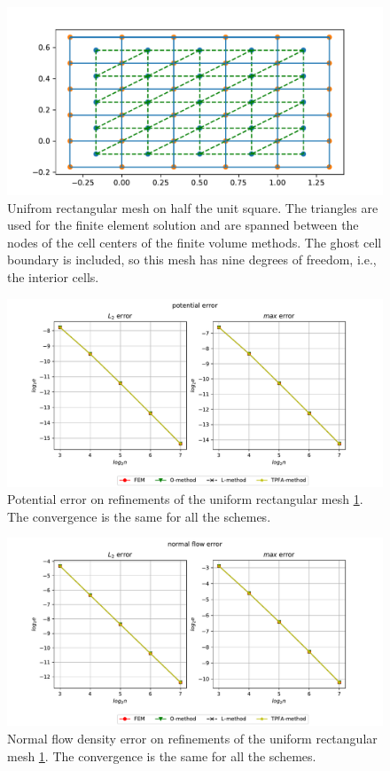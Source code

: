 \documentclass[../Main/main.tex]{subfiles}
\begin{document}
		\newpage
		\begin{figure}[H]
			\centering
			\includegraphics[width=1\textwidth]{orthognal_mesh.pdf}
			\caption{Unifrom rectangular mesh on half the unit square. The triangles are used for the finite element solution and are spanned between the nodes of the cell centers of the finite volume methods. The ghost cell boundary is included, so this mesh has nine degrees of freedom, i.e., the interior cells.}
			\label{fig:mesh_uniform}
		\end{figure}
		\begin{figure}[H]
					\advance\leftskip-1cm
			\includegraphics[width=1.2\textwidth]{pressure_quadratic.pdf}
			\caption{Potential error on refinements of the uniform rectangular mesh \ref{fig:mesh_uniform}. The convergence is the same for all the schemes.}
			\label{fig:mesh_uniform_potential}
		\end{figure}
		\begin{figure}[H]
			
			\advance\leftskip-1cm
			\includegraphics[width=1.2\textwidth]{flow_quadratic.pdf}
			\caption{Normal flow density error on refinements of the uniform rectangular mesh \ref{fig:mesh_uniform}. The convergence is the same for all the schemes.}
			\label{fig:mesh_uniform_flow}
		\end{figure}
\end{document}
